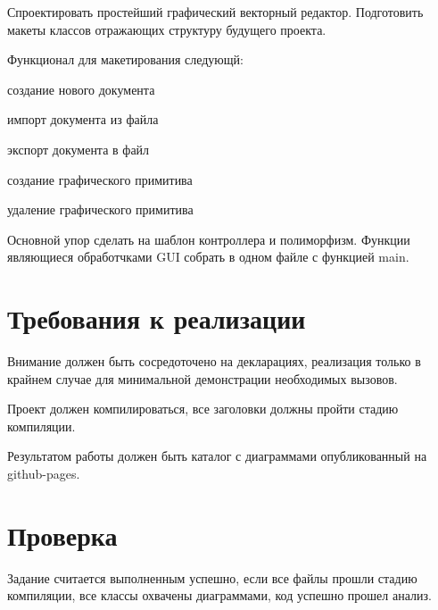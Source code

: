 Спроектировать простейший графический векторный редактор. Подготовить макеты классов отражающих структуру будущего проекта.

Функционал для макетирования следующй\-:
\begin{DoxyItemize}
\item создание нового документа
\item импорт документа из файла
\item экспорт документа в файл
\item создание графического примитива
\item удаление графического примитива
\end{DoxyItemize}

Основной упор сделать на шаблон контроллера и полиморфизм. Функции являющиеся обработчками G\-U\-I собрать в одном файле с функцией main.

\section*{Требования к реализации}

Внимание должен быть сосредоточено на декларациях, реализация только в крайнем случае для минимальной демонстрации необходимых вызовов.

Проект должен компилироваться, все заголовки должны пройти стадию компиляции.

Результатом работы должен быть каталог с диаграммами опубликованный на github-\/pages.

\section*{Проверка}

Задание считается выполненным успешно, если все файлы прошли стадию компиляции, все классы охвачены диаграммами, код успешно прошел анализ. 